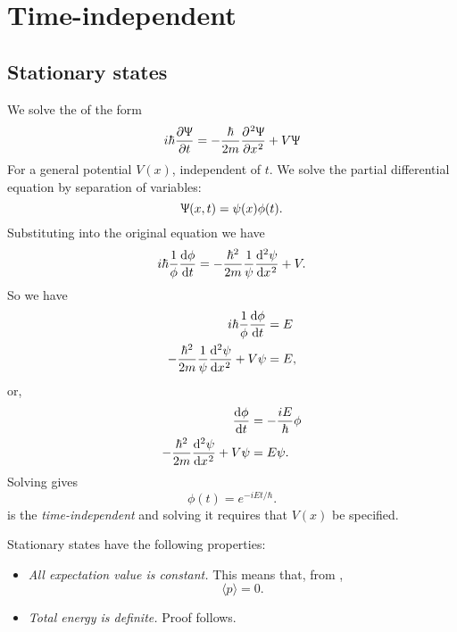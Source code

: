 \section{Time-independent \sch}
\subsection{Stationary states}
We solve the \sch of the form
\begin{equation}
i\hbar\diffp{\ups}{t}=-\frac{\hbar}{2m}\diffp[2]{\ups}{x}+V\ups
\end{equation}
For a general potential $V(x)$, independent of $t$. We solve the partial differential equation by separation of variables: 
\begin{equation}
\Uppsi(x,t)=\psi(x)\phi(t). 
\end{equation}
Substituting into the original equation we have 
\begin{equation}
i\hbar\frac{1}{\phi}\diff{\phi}{t}=-\frac{\hbar^2}{2m}\frac{1}{\psi}\diff[2]{\psi}{x}+V.
\end{equation}
So we have
\begin{subequations}
\begin{align}
i\hbar\frac{1}{\phi}\diff{\phi}{t}&=E \\
-\frac{\hbar^2}{2m}\frac{1}{\psi}\diff[2]{\psi}{x}+V\psi&=E, 
\end{align}
\end{subequations}
or, 
\begin{subequations}
\begin{align}
\diff{\phi}{t}&=-\frac{iE}{\hbar}\phi \label{time_eq}\\
-\frac{\hbar^2}{2m}\diff[2]{\psi}{x}+V\psi&=E\psi. \label{spatial_eq}
\end{align}
\end{subequations}
Solving  gives 
\begin{equation}
\phi(t)=e^{-iEt/\hbar}.
\end{equation}
 is the \textit{time-independent \sch} and solving it requires that $V(x)$ be specified. \\
\begin{prt}
\label{prt:stationary}
Stationary states have the following properties:
\begin{itemize}
\item \textit{All expectation value is constant.} This means that, from ,  
\begin{equation}
\langle p\rangle=0. 
\end{equation}
\item \textit{Total energy is definite.} Proof follows. 
\end{itemize}
\end{prt}

